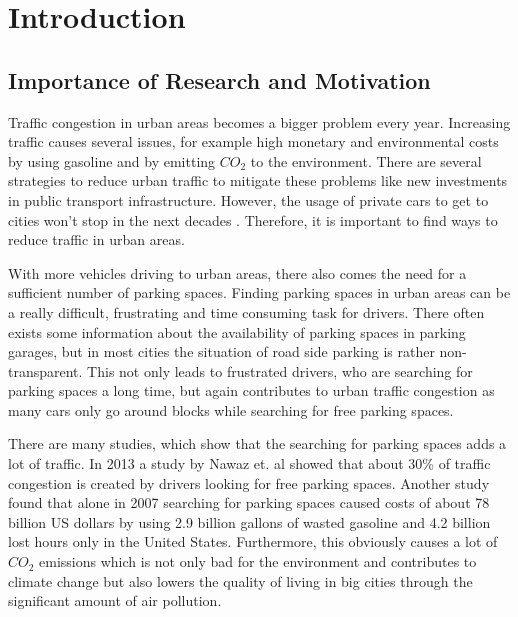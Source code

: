 \chapter{Introduction}
\label{sec:introduction}




\section{Importance of Research and Motivation}
Traffic congestion in urban areas becomes a bigger problem every year. Increasing traffic causes several issues, for example high monetary and environmental costs by using gasoline and by emitting $CO_2$ to the environment. There are several strategies to reduce urban traffic to mitigate these problems like new investments in public transport infrastructure. However, the usage of private cars to get to cities won't stop in the next decades . Therefore, it is important to find ways to reduce traffic in urban areas.

With more vehicles driving to urban areas, there also comes the need for a sufficient number of parking spaces. Finding parking spaces in urban areas can be a really difficult, frustrating and time consuming task for drivers. There often exists some information about the availability of parking spaces in parking garages, but in most cities the situation of road side parking is rather non-transparent. This not only leads to frustrated drivers, who are searching for parking spaces a long time, but again contributes to urban traffic congestion as many cars only go around blocks while searching for free parking spaces. 

There are many studies, which show that the searching for parking spaces adds a lot of traffic. In 2013 a study by Nawaz et. al \cite{Nawaz:2013:PSB:2500423.2500438} showed that about 30\% of traffic congestion is created by drivers looking for free parking spaces. Another study \cite{TexasMobilityReport} found that alone in 2007 searching for parking spaces caused costs of about 78 billion US dollars by using 2.9 billion gallons of wasted gasoline and 4.2 billion lost hours only in the United States. Furthermore, this obviously causes a lot of $CO_2$ emissions which is not only bad for the environment and contributes to climate change but also lowers the quality of living in big cities through the significant amount of air pollution.

